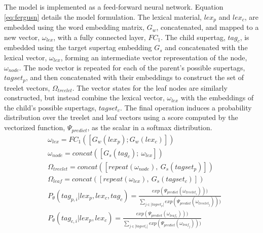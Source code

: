 \documentclass[11pt]{article}
\begin{document}
The model is implemented as a feed-forward neural network.
%
Equation \ref{eq:fergusn} details the model formulation.
%
The lexical material, $lex_p$ and $lex_c$, are embedded using the word embedding matrix, $G_w$, concatenated, and mapped to a new vector, $\omega_{lex}$, with a fully connected layer, $FC_1$.
%
The child supertag, $tag_c$, is embedded using the target supertag embedding
$G_s$ and concatenated with the lexical vector, $\omega_{lex}$, forming an intermediate vector representation of the node, $\omega_{node}$.
%
The node vector is repeated for each of the parent's possible supertags, $tagset_p$, and then concatenated with their embeddings to construct the set of treelet vectors, $\Omega_{treelet}$.
%
The vector states for the leaf nodes are similarly constructed, but instead combine the lexical vector, $\omega_{lex}$ with the embeddings of the child's possible supertags, $tagset_c$.
%
The final operation induces a probability distribution over the treelet and leaf vectors using a score computed by the vectorized function, $\Psi_{predict}$, as the scalar in a softmax distribution. 
%
\begin{align}
&\omega_{lex} = FC_1([G_w(lex_p); G_w(lex_c)]) \label{eq:fergusn} \\
&\omega_{node}=concat([G_s(tag_c);~\omega_{lex}]) \nonumber \\
&\Omega_{treelet} = concat([repeat(\omega_{node}),~G_s(tagset_p)]) \nonumber \\
&\Omega_{leaf} = concat([repeat(\omega_{lex}),~G_s(tagset_c)]) \nonumber \\
&P_\theta(tag_{p,i} | lex_{p}, lex_{c}, tag_{c})=
\frac{exp(\Psi_{predict}(\omega_{treelet_i})))}
{\sum_{j \in |tagset_p|} exp(\Psi_{predict}(\omega_{treelet_j})))} \nonumber \\
&P_\theta(tag_{c,i} |lex_{p}, lex_{c}) = 
\frac{exp(\Psi_{predict}(\omega_{leaf_i})))}
{\sum_{j \in |tagset_c|} exp(\Psi_{predict}(\omega_{leaf_j})))} \nonumber 
\end{align}
\end{document}
